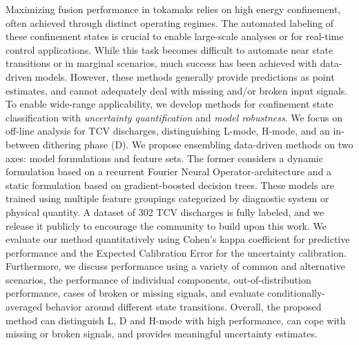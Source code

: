 Maximizing fusion performance in tokamaks relies on high energy confinement, often achieved through distinct operating regimes. The automated labeling of these confinement states is crucial to enable large-scale analyses or for real-time control applications. While this task becomes difficult to automate near state transitions or in marginal scenarios, much success has been achieved with data-driven models. However, these methods generally provide predictions as point estimates, and cannot adequately deal with missing and/or broken input signals. To enable wide-range applicability, we develop methods for confinement state classification with \textit{uncertainty quantification} and \textit{model robustness}. We focus on off-line analysis for TCV discharges, distinguishing L-mode, H-mode, and an in-between dithering phase (D). We propose ensembling data-driven methods on two axes: model formulations and feature sets. The former considers a dynamic formulation based on a recurrent Fourier Neural Operator-architecture and a static formulation based on gradient-boosted decision trees. These models are trained using multiple feature groupings categorized by diagnostic system or physical quantity. A dataset of 302 TCV discharges is fully labeled, and we release it publicly to encourage the community to build upon this work. We evaluate our method quantitatively using Cohen's kappa coefficient for predictive performance and the Expected Calibration Error for the uncertainty calibration. Furthermore, we discuss performance using a variety of common and alternative scenarios, the performance of individual components, out-of-distribution performance, cases of broken or missing signals, and evaluate conditionally-averaged behavior around different state transitions. Overall, the proposed method can distinguish L, D and H-mode with high performance, can cope with missing or broken signals, and provides meaningful uncertainty estimates. 

